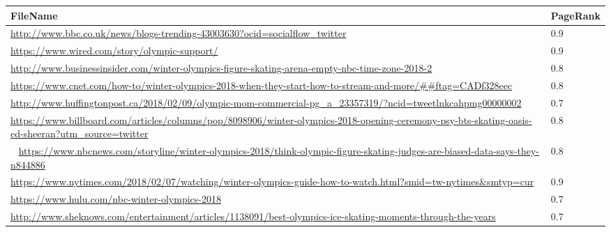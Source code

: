 \documentclass[11pt]{report}
\begin{document}
\begin{tabularx}{\textwidth}{X|l}
 \hline
FileName & PageRank\\\hline 
\url{http://www.bbc.co.uk/news/blogs-trending-43003630?ocid=socialflow_twitter} 
& 0.9\\\hline 
\url{https://www.wired.com/story/olympic-support/} 
& 0.9\\\hline 
\url{http://www.businessinsider.com/winter-olympics-figure-skating-arena-empty-nbc-time-zone-2018-2} 
& 0.8\\\hline 
\url{https://www.cnet.com/how-to/winter-olympics-2018-when-they-start-how-to-stream-and-more/##ftag=CADf328eec}
 & 0.8\\\hline 
\url{http://www.huffingtonpost.ca/2018/02/09/olympic-mom-commercial-pg_a_23357319/?ncid=tweetlnkcahpmg00000002} 
& 0.7\\ \hline 
\url{https://www.billboard.com/articles/columns/pop/8098906/winter-olympics-2018-opening-ceremony-psy-bts-skating-oasis-ed-sheeran?utm_source=twitter} 
& 0.8\\\ \hline 
\url{https://www.nbcnews.com/storyline/winter-olympics-2018/think-olympic-figure-skating-judges-are-biased-data-says-they-n844886}
 & 0.8\\\hline 
\url{https://www.nytimes.com/2018/02/07/watching/winter-olympics-guide-how-to-watch.html?smid=tw-nytimes&smtyp=cur} 
& 0.9\\ \hline 
\url{https://www.hulu.com/nbc-winter-olympics-2018} 
& 0.7\\\hline 
\url{http://www.sheknows.com/entertainment/articles/1138091/best-olympics-ice-skating-moments-through-the-years} 
& 0.7\\\hline 

\end{tabularx}
\end{document}
